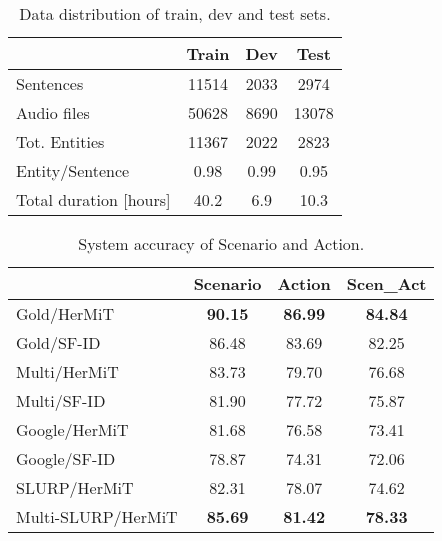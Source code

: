 \documentclass[11pt,a4paper]{article}
\newcommand{\hermit}{HerMiT}
\newcommand{\sfid}{SF-ID}
\begin{document}
\begin{table}[t]
	\centering
	\footnotesize
	\begin{tabular}{l|ccc}
	\toprule
	& Train & Dev & Test\\
	\midrule
	Sentences & 11514 & 2033 & 2974 \\
    Audio files & 50628 & 8690 & 13078 \\
    Tot. Entities & 11367 & 2022 & 2823 \\
    Entity/Sentence & 0.98 & 0.99 & 0.95 \\
    Total duration [hours]  & 40.2 & 6.9 & 10.3 \\
    \bottomrule
	\end{tabular}
	\caption{Data distribution of train, dev and test sets.}
	\label{tab:split}
\end{table}




\begin{table}[t]
	\centering
	\footnotesize
	\begin{tabular}{l|ccc}
	\toprule
	& \textbf{Scenario} & \textbf{Action} & \textbf{Scen\_Act}\\
	\midrule
	Gold/\hermit & {\bf 90.15} & {\bf 86.99} & {\bf 84.84} \\
	Gold/\sfid & 86.48 & 83.69 & 82.25 \\
	\midrule
    Multi/\hermit & 83.73 & 79.70 & 76.68 \\
    Multi/\sfid & 81.90 & 77.72 & 75.87 \\
    Google/\hermit & 81.68 & 76.58 & 73.41\\
    Google/\sfid & 78.87 & 74.31 & 72.06\\
    \midrule SLURP/\hermit & 82.31 & 78.07 & 74.62 \\
    {\scriptsize Multi-SLURP/\hermit} & {\bf 85.69} & {\bf 81.42} & {\bf 78.33} \\
    \bottomrule
   	\end{tabular}
	\caption{System accuracy of Scenario and Action.}
	\label{tab:intents}
\end{table}
\end{document}
